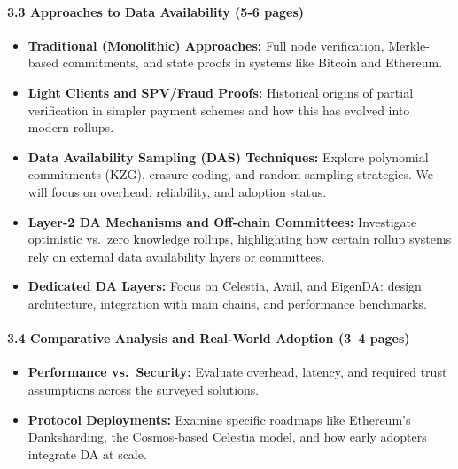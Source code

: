 \documentclass[12pt]{article}
\begin{document}
\paragraph{3.3 Approaches to Data Availability (5-6 pages)}
\begin{itemize}
    \item \textbf{Traditional (Monolithic) Approaches:} Full node verification, 
    Merkle-based commitments, and state proofs in systems like Bitcoin and Ethereum.
    \item \textbf{Light Clients and SPV/Fraud Proofs:} Historical origins 
    of partial verification in simpler payment schemes and how this has evolved into 
    modern rollups.
    \item \textbf{Data Availability Sampling (DAS) Techniques:} Explore polynomial 
    commitments (KZG), erasure coding, and random sampling strategies. We will focus on overhead, reliability, and adoption status.
    \item \textbf{Layer-2 DA Mechanisms and Off-chain Committees:} Investigate 
    optimistic vs.\ zero knowledge rollups, highlighting how certain rollup systems rely on external data availability layers or committees.
    \item \textbf{Dedicated DA Layers:} Focus on Celestia, Avail, and EigenDA: design 
    architecture, integration with main chains, and performance benchmarks.
\end{itemize}

\paragraph{3.4 Comparative Analysis and Real-World Adoption (3--4 pages)}
\begin{itemize}
    \item \textbf{Performance vs.\ Security:} Evaluate overhead, latency, 
    and required trust assumptions across the surveyed solutions. 
    \item \textbf{Protocol Deployments:} Examine specific roadmaps like Ethereum's 
    Danksharding, the Cosmos-based Celestia model, and how early adopters 
    integrate DA at scale.
\end{itemize}
\end{document}

